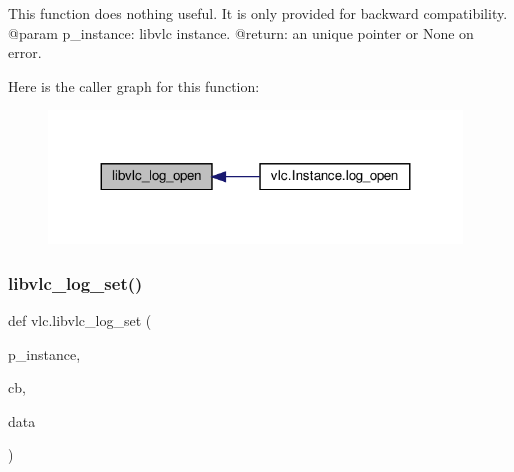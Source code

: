 \begin{DoxyVerb}This function does nothing useful.
It is only provided for backward compatibility.
@param p_instance: libvlc instance.
@return: an unique pointer or None on error.
\end{DoxyVerb}
 Here is the caller graph for this function\+:
\nopagebreak
\begin{figure}[H]
\begin{center}
\leavevmode
\includegraphics[width=311pt]{namespacevlc_a03e79554e536d7e5cb215042e619966e_icgraph}
\end{center}
\end{figure}
\mbox{\label{namespacevlc_aff40c0e783a0949925936432b4beba34}} 
\subsubsection{\texorpdfstring{libvlc\+\_\+log\+\_\+set()}{libvlc\_log\_set()}}
{\footnotesize\ttfamily def vlc.\+libvlc\+\_\+log\+\_\+set (\begin{DoxyParamCaption}\item[{}]{p\+\_\+instance,  }\item[{}]{cb,  }\item[{}]{data }\end{DoxyParamCaption})}

